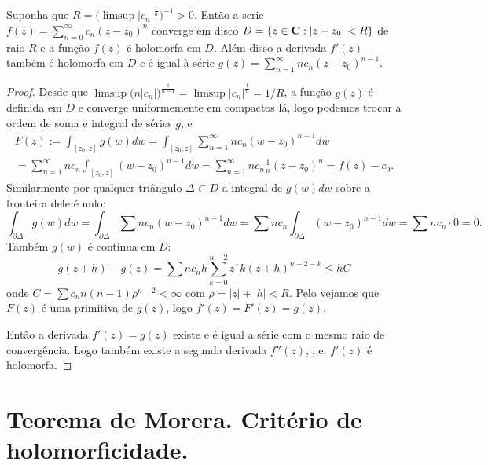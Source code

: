 \begin{teorema}
\label{t:series-derhol}
Suponha que $R = \big(\limsup |c_n|^{\frac1n}\big)^{-1} > 0$. Então a serie
$f(z) = \sum_{n=0}^\infty c_n (z-z_0)^n$ converge em disco
$D = \{z\in\mathbf{C} : |z-z_0|<R\}$ de raio $R$ e a função $f(z)$ é holomorfa em $D$.
Além disso a derivada $f'(z)$ também é holomorfa em $D$
e é igual à série $g(z) = \sum_{n=1}^\infty n c_n (z-z_0)^{n-1}$.
\end{teorema}
\begin{proof}
Desde que $\limsup \big(n|c_n|\big)^{\frac{1}{n-1}} = \limsup |c_n|^{\frac1n} = 1/R$,
a função $g(z)$ é definida em $D$ e converge uniformemente em compactos lá,
logo podemos trocar a ordem de soma e integral de séries $g$, e
\begin{multline}
F(z) := \int_{[z_0,z]} g(w) dw
= \int_{[z_0,z]} \sum_{n=1}^\infty n c_n (w-z_0)^{n-1} dw
\\
= \sum_{n=1}^\infty n c_n \int_{[z_0,z]} (w-z_0)^{n-1} dw
= \sum_{n=1}^\infty n c_n \frac1n (z-z_0)^n = f(z) - c_0.
\end{multline}
Similarmente por qualquer triângulo $\Delta \subset D$ a integral de $g(w)dw$ sobre a fronteira dele é nulo:
\[ \int_{\partial \Delta} g(w) dw = \int_{\partial \Delta} \sum n c_n (w-z_0)^{n-1} dw
= \sum n c_n \int_{\partial \Delta} (w-z_0)^{n-1} dw = \sum n c_n \cdot 0 = 0. \]
Também $g(w)$ é contínua em $D$:
\[ g(z+h) - g(z) = \sum n c_n h \sum_{k=0}^{n-2} zˆk (z+h)^{n-2-k}
\leq h C \]
onde $C = \sum c_n n (n-1) \rho^{n-2} < \infty$ com $\rho = |z|+|h|<R$.
Pelo  vejamos que $F(z)$ é uma primitiva de $g(z)$,
logo $f'(z) = F'(z) = g(z)$.

Então a derivada $f'(z) = g(z)$ existe e é igual a série com o mesmo raio de convergência.
Logo também existe a segunda derivada $f''(z)$, i.e. $f'(z)$ é holomorfa.
\end{proof}

\section{Teorema de Morera. Critério de holomorficidade.}

